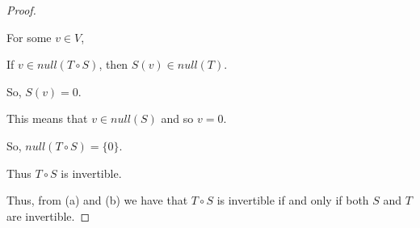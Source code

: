 \documentclass[12pt,letterpaper]{article}
\begin{document}
\begin{enumerate}
\begin{proof}
\begin{enumerate}
            For some $v \in V$,

            If $v \in null(T \circ S)$, then
            $S(v) \in null(T)$.

            So, $S(v) = 0$.

            This means that $v \in null(S)$ and so $v = 0$.

            So, $null(T \circ S) = \{0\}$.

            Thus $T \circ S$ is invertible.
        \end{enumerate}

        Thus, from (a) and (b) we have that $T \circ S$ is invertible if and only if both $S$ and $T$ are invertible.
      \end{proof}
  \end{enumerate}
\end{document}
